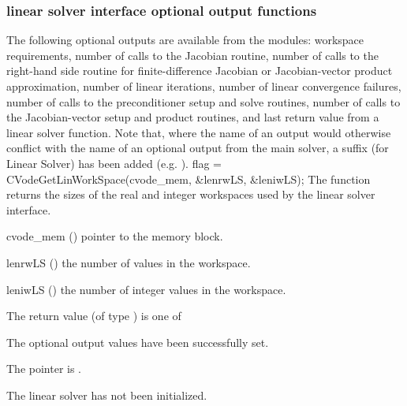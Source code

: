 \subsubsection{{\cvls} linear solver interface optional output functions}
\label{sss:optout_ls}
The following optional outputs are available from the {\cvls} modules:
workspace requirements,
number of calls to the Jacobian routine,
number of calls to the right-hand side routine for finite-difference Jacobian or Jacobian-vector product approximation,
number of linear iterations,
number of linear convergence failures,
number of calls to the preconditioner setup and solve routines,
number of calls to the Jacobian-vector setup and product routines,
and last return value from a linear solver function.
Note that, where the name of an output would otherwise conflict with
the name of an optional output from the main solver, a suffix 
(for Linear Solver) has been added (e.g. ).
{
  flag = CVodeGetLinWorkSpace(cvode\_mem, \&lenrwLS, \&leniwLS);
}
{
  The function  returns the sizes of the real and
  integer workspaces used by the {\cvls} linear solver interface.
}
{
  \begin{args}
  \item[cvode\_mem] ()
    pointer to the {\cvodes} memory block.
  \item[lenrwLS] ()
    the number of  values in the {\cvls} workspace.
  \item[leniwLS] ()
    the number of integer values in the {\cvls} workspace.
  \end{args}
}
{
  The return value  (of type ) is one of
  \begin{args}
  \item[\Id{CVLS\_SUCCESS}]
    The optional output values have been successfully set.
  \item[\Id{CVLS\_MEM\_NULL}]
    The  pointer is .
  \item[\Id{CVLS\_LMEM\_NULL}]
    The {\cvls} linear solver has not been initialized.
  \end{args}
}

